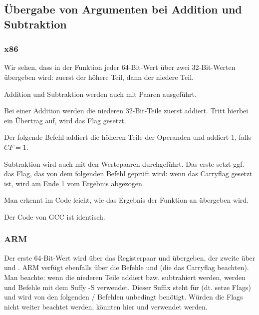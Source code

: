 \subsection{Übergabe von Argumenten bei Addition und Subtraktion}



\subsubsection{x86}


Wir sehen, dass in der Funktion  jeder 64-Bit-Wert über zwei 32-Bit-Werten übergeben wird: zuerst
der höhere Teil, dann der niedere Teil.

Addition und Subtraktion werden auch mit Paaren ausgeführt.

Bei einer Addition werden die niederen 32-Bit-Teile zuerst addiert.
Tritt hierbei ein Übertrag auf, wird das \CF Flag gesetzt.

Der folgende  Befehl addiert die höheren Teile der Operanden und addiert 1, falls $CF=1$.

Subtraktion wird auch mit den Wertepaaren durchgeführt.
Das erste \SUB setzt ggf. das \CF Flag, das von dem folgenden  Befehl geprüft wird:
wenn das Carryflag gesetzt ist, wird am Ende 1 vom Ergebnis abgezogen.

Man erkennt im Code leicht, wie das Ergebnis der Funktion  an \printf übergeben wird.



Der Code von GCC ist identisch.

\subsubsection{ARM}



Der erste 64-Bit-Wert wird über das Registerpaar  und  übergeben, der zweite über  und .
ARM verfügt ebenfalls über die Befehle  und  (die das Carryflag beachten).
Man beachte: wenn die niederen Teile addiert bzw. subtrahiert werden, werden  und  Befehle mit dem
Suffy -S verwendet. Dieser Suffix steht für  (dt. setze Flags) und wird von den folgenden
/ Befehlen unbedingt benötigt. Würden die Flags nicht weiter beachtet werden, könnten hier \ADD und
\SUB verwendet werden.

